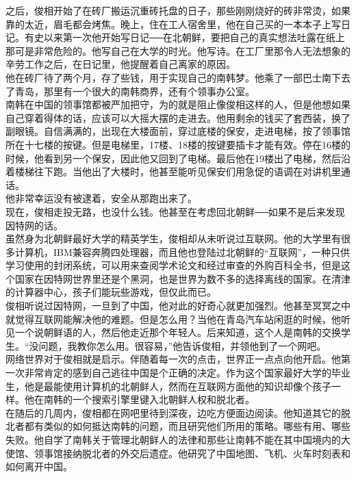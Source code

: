 之后，俊相开始了在砖厂搬运沉重砖托盘的日子，那些刚刚烧好的砖非常烫，如果靠的太近，眉毛都会烤焦。晚上，住在工人宿舍里，他在自己买的一本本子上写日记。有史以来第一次他开始写日记──在北朝鲜，要把自己的真实想法吐露在纸上那可是非常危险的。他写自己在大学的时光。他写诗。在工厂里那令人无法想象的辛劳工作之后，在日记里，他提醒着自己离家的原因。\\

他在砖厂待了两个月，存了些钱，用于实现自己的南韩梦。他乘了一部巴士南下去了青岛，那里有一个很大的南韩商界，还有个领事办公室。\\

南韩在中国的领事馆都被严加把守，为的就是阻止像俊相这样的人，但是他想如果自己穿着得体的话，应该可以大摇大摆的走进去。他用剩余的钱买了套西装，换了副眼镜。自信满满的，出现在大楼面前，穿过底楼的保安，走进电梯，按了领事馆所在十七楼的按键。但是电梯里，17楼、18楼的按键要插卡才能有效。停在16楼的时候，他看到另一个保安，因此他又回到了电梯。最后他在19楼出了电梯，然后沿着楼梯往下跑。当他出了大楼时，他甚至能听见保安们用急促的语调在对讲机里通话。\\

他非常幸运没有被逮着，安全从那跑出来了。\\

现在，俊相走投无路，也没什么钱。他甚至在考虑回北朝鲜──如果不是后来发现因特网的话。\\

虽然身为北朝鲜最好大学的精英学生，俊相却从未听说过互联网。他的大学里有很多计算机，IBM兼容奔腾四处理器，而且他也登陆过北朝鲜的“互联网”，一种只供学习使用的封闭系统，可以用来查阅学术论文和经过审查的外购百科全书，但是这个国家在因特网世界里还是个黑洞，也是世界为数不多的选择离线的国家。在清津的计算器中心，孩子们能玩些游戏，但仅此而已。\\

俊相听说过因特网，一旦到了中国，他对此的好奇心就更加强烈。他甚至冥冥之中就觉得互联网能解决他的难题。但是怎么用？当他在青岛汽车站闲逛的时候，他听见一个说朝鲜语的人，然后他走近那个年轻人。后来知道，这个人是南韩的交换学生。“没问题，我教你怎么用。很容易，”他告诉俊相，并领他到了一个网吧。\\

网络世界对于俊相就是启示。伴随着每一次的点击，世界正一点点向他开启。他第一次非常肯定的感到自己逃往中国是个正确的决定。作为这个国家最好大学的毕业生，他是最能使用计算机的北朝鲜人，然而在互联网方面他的知识却像个孩子一样。他在南韩的一个搜索引擎里键入北朝鲜人权和脱北者。\\

在随后的几周内，俊相都在网吧里待到深夜，边吃方便面边阅读。他知道其它的脱北者都有类似的如何抵达南韩的问题，而且研究他们所用的策略。哪些有用、哪些失败。他自学了南韩关于管理北朝鲜人的法律和那些让南韩不能在其中国境内的大使馆、领事馆接纳脱北者的外交后遗症。他研究了中国地图、飞机、火车时刻表和如何离开中国。\\

